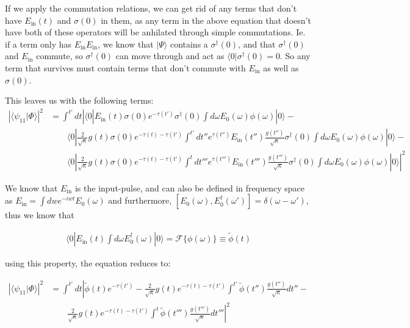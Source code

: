 \documentclass[12pt]{article}
\begin{document}
If we apply the commutation relations, we can get rid of any terms that don't have $E_\textrm{in}(t)$ and $\sigma(0)$ in them, as any term in the above equation that doesn't have both of these operators will be anhilated through simple commutations. Ie. if a term only has $E_\textrm{in} E_\textrm{in}$, we know that $|\Psi\rangle$ contains a $\sigma^\dagger(0)$, and that $\sigma^\dagger(0)$ and $E_\textrm{in}$ commute, so $\sigma^\dagger(0)$ can move through and act as $\langle 0 | \sigma^\dagger(0) = 0$. So any term that survives must contain terms that don't commute with $E_\textrm{in}$ as well as $\sigma(0)$.

This leaves us with the following terms:
\begin{align}
\left | \langle \psi_{11} | \Phi \rangle \right | ^2 &= \int^{t'} dt \left | \langle 0 | E_\textrm{in}(t) \sigma(0) e^{-\tau(t')}
\sigma^\dagger(0) \int d\omega E_0(\omega) \phi(\omega) | 0 \rangle -\right. \\
&\qquad  \langle 0 | \frac{2}{\sqrt{\kappa}} g(t) \sigma(0) e^{-\tau(t) -\tau(t')}
\int^{t'} dt'' e^{\tau(t'')} E_\textrm{in}(t'')\frac{g(t'')}{\sqrt{\kappa}} \sigma^\dagger(0) \int d\omega E_0(\omega) \phi(\omega) | 0 \rangle - \\
& \qquad \left. \langle 0 | \frac{2}{\sqrt{\kappa}} g(t) \sigma(0) e^{-\tau(t) -\tau(t')}
\int^{t} dt''' e^{\tau(t''')} E_\textrm{in}(t''')\frac{g(t''')}{\sqrt{\kappa}} \sigma^\dagger(0) \int d\omega E_0(\omega) \phi(\omega) | 0 \rangle \right |^2
\end{align}


We know that $E_\textrm{in}$ is the input-pulse, and can also be defined in frequency space as $E_\textrm{in} = \int dw e^{-iwt} E_0(\omega) $ and furthermore, $[E_0(\omega), E_0^\dagger(\omega') ] = \delta(\omega-\omega')$, thus we know that 

\begin{align}
\langle 0 |E_\textrm{in}(t) \int d\omega E^\dagger_0(\omega) | 0 \rangle= \mathscr{F}\{\phi(\omega)\} \equiv \tilde{\phi}(t)
\end{align}

using this property, the equation reduces to:

\begin{align}
\left | \langle \psi_{11} | \Phi \rangle \right | ^2 &= \int^{t'} dt\left| \tilde{\phi}(t)e^{-\tau(t')} -\frac{2}{\sqrt{\kappa}} g(t) e^{-\tau(t)-\tau(t')} \int^{t'} \tilde{\phi}(t'')\frac{g(t'')}{\sqrt{\kappa}} dt'' - \right.\\
&\left. \qquad \frac{2}{\sqrt{\kappa}} g(t) e^{-\tau(t)-\tau(t')} \int^t \tilde{\phi}(t''')\frac{g(t''')}{\sqrt{\kappa}} dt''' \right |^2 
\end{align}
\end{document}
